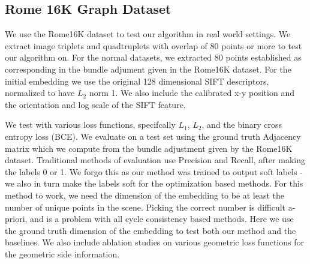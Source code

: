 \documentclass[10pt,twocolumn,letterpaper]{article}
\begin{document}
\subsection{Rome 16K Graph Dataset}
We  use the Rome16K dataset \cite{li2010location} to test our algorithm in real world settings.
We extract image triplets and quadtruplets with overlap of 80 points or more to test our algorithm on. For the normal datasets, we extracted 80 points established as corresponding in the bundle adjument given in the Rome16K dataset.
For the initial embedding we use the original 128 dimensional SIFT descriptors, normalized to have $L_2$ norm 1. We also include the calibrated x-y position and the orientation and log scale of the SIFT feature.

We test with various loss functions, specifcally $L_1$, $L_2$, and the binary cross entropy loss (BCE).
We evaluate on a test set using the ground truth Adjacency matrix which we compute from the bundle adjustment given by the Rome16K dataset.
Traditional methods of evaluation use Precision and Recall, after making the labels 0 or 1.
We forgo this as our method was trained to output soft labels - we also in turn make the labels soft for the optimization based methods.
For this method to work, we need the dimension of the embedding to be at least the number of unique points in the scene.
Picking the correct number is difficult a-priori, and is a problem with all cycle consistency based methods.
Here we use the ground truth dimension of the embedding to test both our method and the baselines.
We also include ablation studies on various geometric loss functions for the geometric side information.

\end{document}
